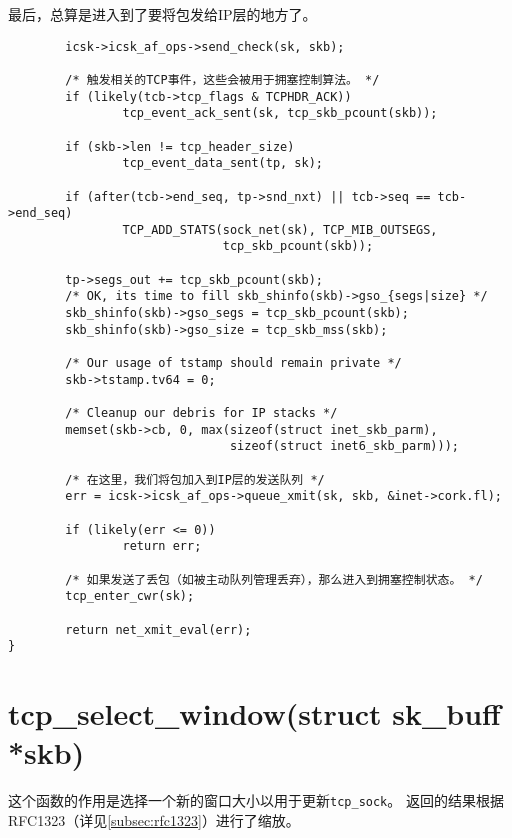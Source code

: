 最后，总算是进入到了要将包发给IP层的地方了。
\begin{verbatim}
        icsk->icsk_af_ops->send_check(sk, skb);

        /* 触发相关的TCP事件，这些会被用于拥塞控制算法。 */
        if (likely(tcb->tcp_flags & TCPHDR_ACK))
                tcp_event_ack_sent(sk, tcp_skb_pcount(skb));

        if (skb->len != tcp_header_size)
                tcp_event_data_sent(tp, sk);

        if (after(tcb->end_seq, tp->snd_nxt) || tcb->seq == tcb->end_seq)
                TCP_ADD_STATS(sock_net(sk), TCP_MIB_OUTSEGS,
                              tcp_skb_pcount(skb));

        tp->segs_out += tcp_skb_pcount(skb);
        /* OK, its time to fill skb_shinfo(skb)->gso_{segs|size} */
        skb_shinfo(skb)->gso_segs = tcp_skb_pcount(skb);
        skb_shinfo(skb)->gso_size = tcp_skb_mss(skb);

        /* Our usage of tstamp should remain private */
        skb->tstamp.tv64 = 0;

        /* Cleanup our debris for IP stacks */
        memset(skb->cb, 0, max(sizeof(struct inet_skb_parm),
                               sizeof(struct inet6_skb_parm)));

        /* 在这里，我们将包加入到IP层的发送队列 */
        err = icsk->icsk_af_ops->queue_xmit(sk, skb, &inet->cork.fl);

        if (likely(err <= 0))
                return err;

        /* 如果发送了丢包（如被主动队列管理丢弃），那么进入到拥塞控制状态。 */
        tcp_enter_cwr(sk);

        return net_xmit_eval(err);
}
\end{verbatim}

\section{tcp\_select\_window(struct sk\_buff *skb)}
这个函数的作用是选择一个新的窗口大小以用于更新\texttt{tcp_sock}。
返回的结果根据RFC1323（详见\ref{subsec:rfc1323}）进行了缩放。

